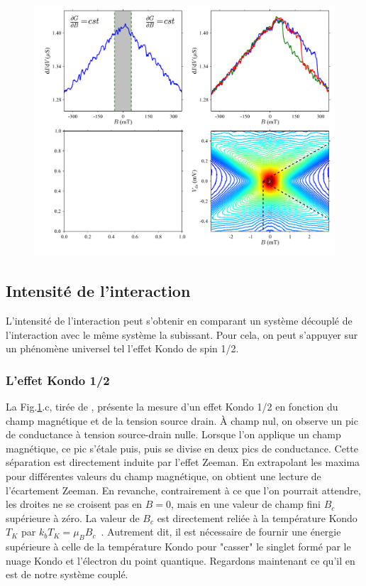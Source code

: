\begin{figure}
\includegraphics[scale=0.5]{Resultats/Chap1/Figure2/figure2.pdf} 
\caption{}
\label{analyse_interaction}
\end{figure}

\subsection{Intensité de l'interaction}
L'intensité de l'interaction peut s'obtenir en comparant un système découplé de l'interaction avec le même système la subissant. Pour cela, on peut s'appuyer sur un phénomène universel tel l'effet Kondo de spin 1/2.

\subsubsection{L'effet Kondo 1/2}
La Fig.\ref{analyse_interaction}.c, tirée de \cite{Roch2009}, présente la mesure d'un effet Kondo 1/2 en fonction du champ magnétique et de la tension source drain. \`A champ nul, on observe un pic de conductance à tension source-drain nulle. Lorsque l'on applique un champ magnétique, ce pic s'étale puis, puis se divise en deux pics de conductance. Cette séparation est directement induite par l'effet Zeeman. En extrapolant les maxima pour différentes valeurs du champ magnétique, on obtient une lecture de l'écartement Zeeman. En revanche, contrairement à ce que l'on pourrait attendre, les droites ne se croisent pas en $B=0$, mais en une valeur de champ fini $B_c$ supérieure à zéro. La valeur de $B_c$ est directement reliée à la température Kondo $T_K$ par $k_bT_K = \mu_B B_c$~\cite{Roch2009}. Autrement dit, il est nécessaire de fournir une énergie supérieure à celle de la température Kondo pour "casser" le singlet formé par le nuage Kondo et l'électron du point quantique. Regardons maintenant ce qu'il en est de notre système couplé.

